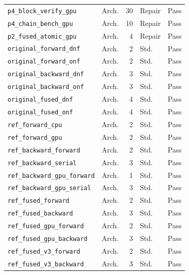 \begin{longtable}{p{2.9in}lrlp{.65in}}
\texttt{p4\_\allowbreak block\_\allowbreak verify\_\allowbreak gpu} & Arch. & 30 & Repair & Pass\\
\texttt{p4\_\allowbreak chain\_\allowbreak bench\_\allowbreak gpu} & Arch. & 10 & Repair & Pass\\
\texttt{p2\_\allowbreak fused\_\allowbreak atomic\_\allowbreak gpu} & Arch. & 4 & Repair & Pass\\
\texttt{original\_\allowbreak forward\_\allowbreak dnf} & Arch. & 2 & Std. & Pass\\
\texttt{original\_\allowbreak forward\_\allowbreak onf} & Arch. & 2 & Std. & Pass\\
\texttt{original\_\allowbreak backward\_\allowbreak dnf} & Arch. & 3 & Std. & Pass\\
\texttt{original\_\allowbreak backward\_\allowbreak onf} & Arch. & 3 & Std. & Pass\\
\texttt{original\_\allowbreak fused\_\allowbreak dnf} & Arch. & 4 & Std. & Pass\\
\texttt{original\_\allowbreak fused\_\allowbreak onf} & Arch. & 4 & Std. & Pass\\
\texttt{ref\_\allowbreak forward\_\allowbreak cpu} & Arch. & 2 & Std. & Pass\\
\texttt{ref\_\allowbreak forward\_\allowbreak gpu} & Arch. & 2 & Std. & Pass\\
\texttt{ref\_\allowbreak backward\_\allowbreak forward} & Arch. & 2 & Std. & Pass\\
\texttt{ref\_\allowbreak backward\_\allowbreak serial} & Arch. & 3 & Std. & Pass\\
\texttt{ref\_\allowbreak backward\_\allowbreak gpu\_\allowbreak forward} & Arch. & 1 & Std. & Pass\\
\texttt{ref\_\allowbreak backward\_\allowbreak gpu\_\allowbreak serial} & Arch. & 3 & Std. & Pass\\
\texttt{ref\_\allowbreak fused\_\allowbreak forward} & Arch. & 2 & Std. & Pass\\
\texttt{ref\_\allowbreak fused\_\allowbreak backward} & Arch. & 3 & Std. & Pass\\
\texttt{ref\_\allowbreak fused\_\allowbreak gpu\_\allowbreak forward} & Arch. & 2 & Std. & Pass\\
\texttt{ref\_\allowbreak fused\_\allowbreak gpu\_\allowbreak backward} & Arch. & 3 & Std. & Pass\\
\texttt{ref\_\allowbreak fused\_\allowbreak v3\_\allowbreak forward} & Arch. & 2 & Std. & Pass\\
\texttt{ref\_\allowbreak fused\_\allowbreak v3\_\allowbreak backward} & Arch. & 3 & Std. & Pass\\

\end{longtable}

